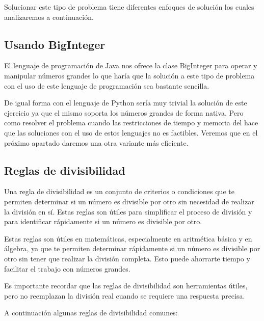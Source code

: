 Solucionar este tipo de problema tiene diferentes enfoques de solución los cuales analizaremos a continuación.

\subsection{Usando BigInteger}

El lenguaje de programación de Java nos ofrece la clase BigInteger para operar y manipular números grandes lo que haría que la solución a este tipo de problema con el uso de este lenguaje de programación sea bastante sencilla.

De igual forma con el lenguaje de Python sería muy trivial la solución de este ejercicio ya que el mismo soporta los números grandes de forma nativa. Pero como resolver el problema cuando las restricciones de tiempo y memoria del hace que las soluciones con el uso de estos lenguajes no es factibles. Veremos que en el próximo apartado daremos una otra variante más eficiente.  

\subsection{Reglas de divisibilidad}
Una regla de divisibilidad es un conjunto de criterios o condiciones que te permiten determinar si un número es divisible por otro sin necesidad de realizar la división en sí. Estas reglas son útiles para simplificar el proceso de división y para identificar rápidamente si un número es divisible por otro.

Estas reglas son útiles en matemáticas, especialmente en aritmética básica y en álgebra, ya que te permiten determinar rápidamente si un número es divisible por otro sin tener que realizar la división completa. Esto puede ahorrarte tiempo y facilitar el trabajo con números grandes.

Es importante recordar que las reglas de divisibilidad son herramientas útiles, pero no reemplazan la división real cuando se requiere una respuesta precisa. 

A continuación algunas reglas de divisibilidad comunes:

